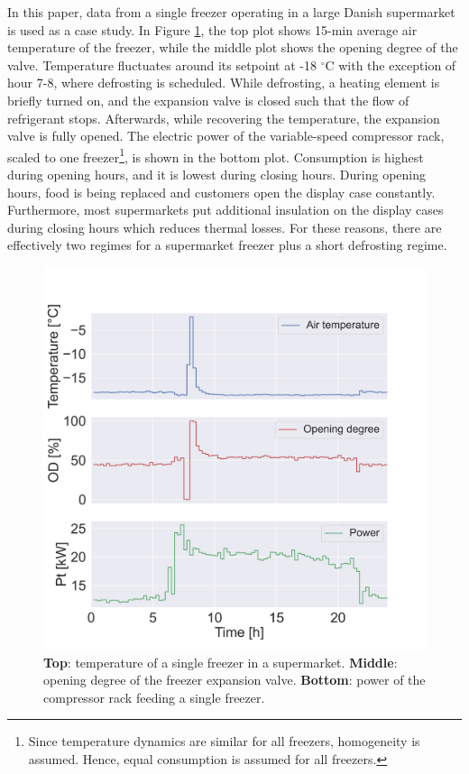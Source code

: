 In this paper, data from a single freezer operating in a large Danish supermarket is used as a case study. 
In Figure \ref{fig:chunk}, the top plot shows 15-min average air temperature of the freezer, while the middle plot shows the opening degree of the valve.
Temperature fluctuates around its setpoint at -18 $^{\circ}$C with the exception of hour 7-8, where defrosting is scheduled.
While defrosting, a heating element is briefly turned on, and the expansion valve is closed such that the flow of refrigerant stops. Afterwards, while recovering the temperature, the expansion valve is fully opened. 
The electric power of the variable-speed compressor rack, scaled to one freezer\footnote{Since temperature dynamics are similar for all freezers, homogeneity is assumed. Hence, equal consumption is assumed for all freezers.}, is shown in the bottom plot. 
Consumption is highest during opening hours, and it is lowest during closing hours. 
During opening hours, food is being replaced and customers open the display case constantly. 
Furthermore, most supermarkets put additional insulation on the display cases during closing hours which reduces thermal losses. 
For these reasons, there are effectively two regimes for a supermarket freezer plus a short defrosting regime.
\begin{figure}[!t]
    \centering
    \includegraphics[width=\columnwidth]{../figures/tmp_od_Pt.png}
    \caption{\textbf{Top}: temperature of a single freezer in a supermarket. \textbf{Middle}: opening degree of the freezer expansion valve. \textbf{Bottom}: power of the compressor rack feeding a single freezer.}
    \label{fig:chunk}
\end{figure}


